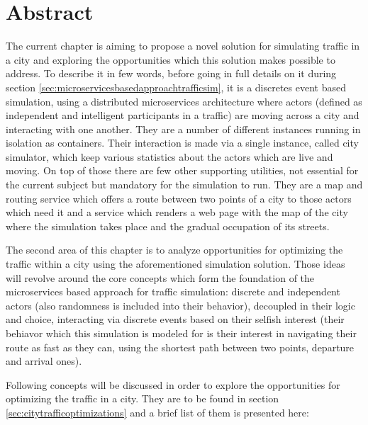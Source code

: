 \documentclass[a4paper,12pt,twoside]{book}
\begin{document}
\section{Abstract}

The current chapter is aiming to propose a novel solution for simulating traffic in a city and exploring the opportunities which this solution makes possible to address. To describe it in few words, before going in full details on it during section \ref{sec:microservicesbasedapproachtrafficsim}, it is a discretes event based simulation, using a distributed microservices architecture where actors (defined as independent and intelligent participants in a traffic) are moving across a city and interacting with one another. They are a number of different instances running in isolation as containers. Their interaction is made via a single instance, called city simulator, which keep various statistics about the actors which are live and moving. On top of those there are few other supporting utilities, not essential for the current subject but mandatory for the simulation to run. They are a map and routing service which offers a route between two points of a city to those actors which need it and a service which renders a web page with the map of the city where the simulation takes place and the gradual occupation of its streets.

The second area of this chapter is to analyze opportunities for optimizing the traffic within a city using the aforementioned simulation solution. Those ideas will revolve around the core concepts which form the foundation of the microservices based approach for traffic simulation: discrete and independent actors (also randomness is included into their behavior), decoupled in their logic and choice, interacting via discrete events based on their selfish interest (their behiavor which this simulation is modeled for is their interest in navigating their route as fast as they can, using the shortest path between two points, departure and arrival ones).

Following concepts will be discussed in order to explore the opportunities for optimizing the traffic in a city. They are to be found in section \ref{sec:citytrafficoptimizations} and a brief list of them is presented here:
\end{document}

